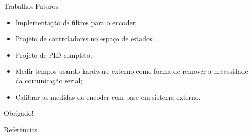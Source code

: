 \documentclass{beamer}
\begin{document}
\begin{frame}{Trabalhos Futuros}
\begin{itemize}
    \item Implementação de filtros para o encoder;
    \item Projeto de controladores no espaço de estados;
    \item Projeto de PID completo;
    \item Medir tempos usando hardware externo como forma de remover a necessidade da comunicação serial;
    \item Calibrar as medidas do encoder com base em sistema externo.
\end{itemize}
\end{frame}

\begin{frame}{}
\centering
\Huge{Obrigado!}
\end{frame}

\nocite{nise2012}

\begin{frame}{Referências}
\end{frame}
\end{document}
